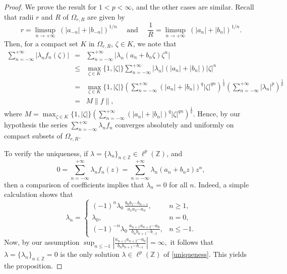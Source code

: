 \documentclass[12pt, reqno]{amsart}
\theoremstyle{definition}
\theoremstyle{remark}
\numberwithin{equation}{section}
\begin{document}
\begin{proof}
We prove the result for $1<p<\infty$, and the other cases are similar. Recall that radii $r$ and $R$ of  $\Omega_{r,R}$ are given by 
\[
r=\limsup_{n\rightarrow +\infty} ~(|a_{-n}|+|b_{-n}|)^{1/n}~~~~~~\text{and}~~~~~~\frac{1}{R}=\limsup_{n\rightarrow +\infty} ~(|a_n|+|b_n|)^{1/n}.
\]
Then, for a compact set $K$ in  $\Omega_{r,R}$, $\zeta \in K$, we note that 
    \begin{eqnarray*}
    \sum_{n=-\infty}^{+\infty} \lvert \lambda_{n}f_{n}(\zeta)\rvert&=&\sum_{n=-\infty}^{+\infty} \lvert \lambda_{n}(a_{n}+b_{n}\zeta)\zeta^{n}\rvert\\
    &\leq&\max_{\zeta\in K} \{1, \lvert \zeta\rvert\}\sum_{n=-\infty}^{+\infty}\lvert\lambda_{n}\rvert(\lvert a_{n}\rvert+\lvert b_{n}\rvert)\lvert \zeta \rvert^{n}\\
    &=&\max_{\zeta\in K} \{1, \lvert \zeta\rvert\} \left( \sum_{n=-\infty}^{+\infty}(\lvert a_{n}\rvert  +\lvert b_{n}\rvert)^{q}\lvert \zeta \rvert^{qn}\right)^{\frac{1}{q}} \left(\sum_{n=-\infty}^{+\infty} \lvert\lambda_{n}\rvert^p\right)^{\frac{1}{p}}\\
    &=& M\lVert f \rVert,
     \end{eqnarray*}
      where  $M=\max_{\zeta\in K} \{1, \lvert \zeta\rvert\} \left( \sum_{n=-\infty}^{+\infty}(\lvert a_{n}\rvert+\lvert b_{n}\rvert)^{q}\lvert \zeta \rvert^{qn}\right)^{\frac{1}{q}}$.      Hence, by our hypothesis the series $\sum_{n=-\infty}^{+\infty}\lambda_{n}f_{n} $ converges absolutely and uniformly on compact subsets of  $\Omega_{r,R}.$ 

      \noindent To verify the uniqueness, if $\lambda=\{\lambda_{n}\}_{n\in\mathbb{Z}}\in \ell^p(\mathbb{Z})$, and
\begin{equation}\label{uniqueness}
    0=\sum_{n=-\infty}^{+\infty} \lambda_{n}f_{n}(z)=\sum_{n=-\infty}^{+\infty}\lambda_{n}(a_{n}+b_{n}z)z^{n},
\end{equation}
then a comparison of coefficients implies that $\lambda_n=0$ for all $n$. Indeed, a simple calculation shows that
\[
\lambda_{n}=
\begin{cases}
\displaystyle
(-1)^{n}\lambda_{0}\,\frac{b_{0} b_{1} \cdots b_{n-1}}{a_{1} a_{2} \cdots a_{n}}, & n \geq 1,\\[1.2ex]
\lambda_{0}, & n = 0, \\[1.2ex]
\displaystyle(-1)^{-n}\lambda_{0}\,
\frac{a_{n+1} a_{n+2} \cdots a_{0}}{b_{n} b_{n+1} \cdots b_{-1}},
& n \leq -1 .
\end{cases}
\]
Now, by our assumption $ \sup_{n\leq -1} \left |\frac{a_{n+1}a_{n+2}\cdots a_0}{b_nb_{n+1}\cdots b_{-1}}\right|=\infty,$ it follows that $\lambda=\{\lambda_{n}\}_{n\in\mathbb{Z}}=0$ is the only solution $\lambda\in \ell^{p}(\mathbb{Z})$ of \eqref{uniqueness}. This yields the proposition.
\end{proof}
\end{document}
